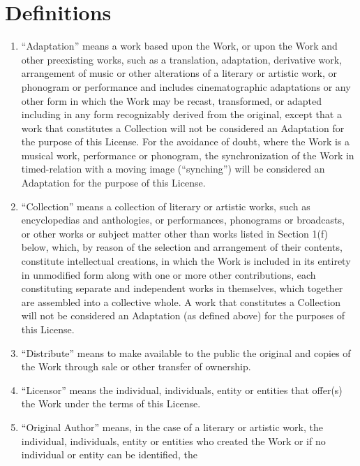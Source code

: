 \section{Definitions}
\begin{enumerate}
 \item  ``Adaptation'' means a work based upon the Work, or upon the
        Work and other preexisting works, such as a translation,
        adaptation, derivative work, arrangement of music or other
        alterations of a literary or artistic work, or phonogram or
        performance and includes cinematographic adaptations or any
        other form in which the Work may be recast, transformed, or
        adapted including in any form recognizably derived from the
        original, except that a work that constitutes a Collection will
        not be considered an Adaptation for the purpose of this
        License. For the avoidance of doubt, where the Work is a musical
        work, performance or phonogram, the synchronization of the Work
        in timed-relation with a moving image (``synching'') will be
        considered an Adaptation for the purpose of this License.
 \item ``Collection'' means a collection of literary or artistic works,
       such as encyclopedias and anthologies, or performances,
       phonograms or broadcasts, or other works or subject matter other
       than works listed in Section 1(f) below, which, by reason of the
       selection and arrangement of their contents, constitute
       intellectual creations, in which the Work is included in its
       entirety in unmodified form along with one or more other
       contributions, each constituting separate and independent works
       in themselves, which together are assembled into a collective
       whole. A work that constitutes a Collection will not be
       considered an Adaptation (as defined above) for the purposes of
       this License.
 \item ``Distribute'' means to make available to the public the original
       and copies of the Work through sale or other transfer of
       ownership.
 \item ``Licensor'' means the individual, individuals, entity or
       entities that offer(s) the Work under the terms of this License.
 \item ``Original Author'' means, in the case of a literary or artistic
       work, the individual, individuals, entity or entities who created
       the Work or if no individual or entity can be identified, the

\end{enumerate}

